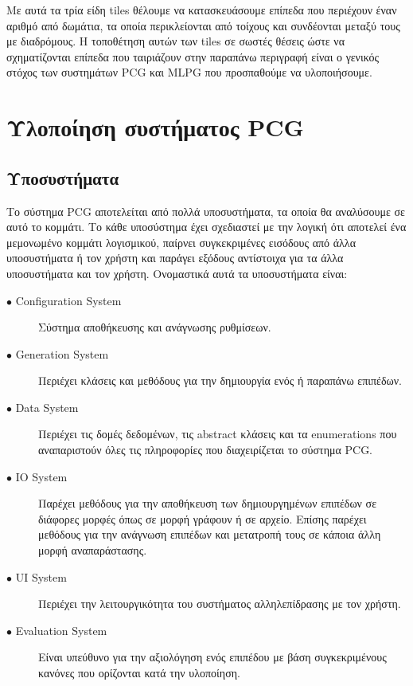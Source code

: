 Με αυτά τα τρία είδη tiles θέλουμε να κατασκευάσουμε επίπεδα που περιέχουν έναν αριθμό από δωμάτια, τα οποία περικλείονται από τοίχους και συνδέονται μεταξύ τους με διαδρόμους. Η τοποθέτηση αυτών των tiles σε σωστές θέσεις ώστε να σχηματίζονται επίπεδα που ταιριάζουν στην παραπάνω περιγραφή είναι ο γενικός στόχος των συστημάτων PCG και MLPG που προσπαθούμε να υλοποιήσουμε.

\section{Υλοποίηση συστήματος PCG}

\subsection{Υποσυστήματα}
Το σύστημα PCG αποτελείται από πολλά υποσυστήματα, τα οποία θα αναλύσουμε σε αυτό το κομμάτι. Το κάθε υποσύστημα έχει σχεδιαστεί με την λογική ότι αποτελεί ένα μεμονωμένο κομμάτι λογισμικού, παίρνει συγκεκριμένες εισόδους από άλλα υποσυστήματα ή τον χρήστη και παράγει εξόδους αντίστοιχα για τα άλλα υποσυστήματα και τον χρήστη. Ονομαστικά αυτά τα υποσυστήματα είναι:

\begin{description}
\item[$\bullet$ Configuration System] Σύστημα αποθήκευσης και ανάγνωσης ρυθμίσεων.
\item[$\bullet$ Generation System] Περιέχει κλάσεις και μεθόδους για την δημιουργία ενός ή παραπάνω επιπέδων.
\item[$\bullet$ Data System] Περιέχει τις δομές δεδομένων, τις abstract κλάσεις και τα enumerations που αναπαριστούν όλες τις πληροφορίες που διαχειρίζεται το σύστημα PCG.
\item[$\bullet$ IO System] Παρέχει μεθόδους για την αποθήκευση των δημιουργημένων επιπέδων σε διάφορες μορφές όπως σε μορφή γράφουν ή σε αρχείο. Επίσης παρέχει μεθόδους για την ανάγνωση επιπέδων και μετατροπή τους σε κάποια άλλη μορφή αναπαράστασης.
\item[$\bullet$ UI System] Περιέχει την λειτουργικότητα του συστήματος αλληλεπίδρασης με τον χρήστη.
\item[$\bullet$ Evaluation System] Είναι υπεύθυνο για την αξιολόγηση ενός επιπέδου με βάση συγκεκριμένους κανόνες που ορίζονται κατά την υλοποίηση.
\end{description}

